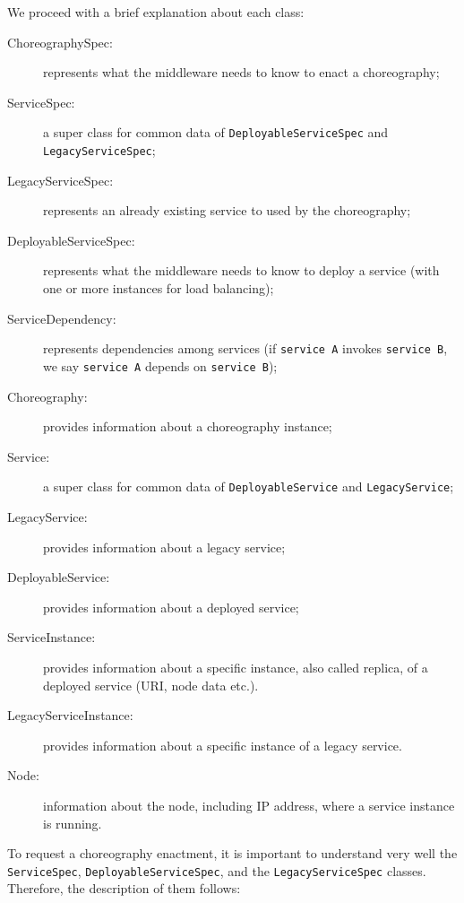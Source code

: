 We proceed with a brief explanation about each class:

\begin{description}
\item [ChoreographySpec:] represents what the middleware needs to know to enact a choreography;
\item [ServiceSpec:] a super class for common data of \verb!DeployableServiceSpec! and \verb!LegacyServiceSpec!;
\item [LegacyServiceSpec:] represents an already existing service to used by the choreography;
\item [DeployableServiceSpec:] represents what the middleware needs to know to deploy a service (with one or more instances for load balancing); 
\item [ServiceDependency:] represents dependencies among services (if \verb!service A! invokes \verb!service B!, we say \verb!service A! depends on \verb!service B!);
\item [Choreography:] provides information about a choreography instance;
\item [Service:] a super class for common data of \verb!DeployableService! and \verb!LegacyService!;
\item [LegacyService:] provides information about a legacy service;
\item [DeployableService:] provides information about a deployed service;
\item [ServiceInstance:] provides information about a specific instance, also called replica, of a deployed service (URI, node data etc.). 
\item [LegacyServiceInstance:] provides information about a specific instance of a legacy service. 
\item [Node:] information about the node, including IP address, where a service instance is running.
\end{description}

To request a choreography enactment, it is important to understand very well the \verb!ServiceSpec!, \verb!DeployableServiceSpec!, and the \verb!LegacyServiceSpec! classes. Therefore, the description of them follows:

